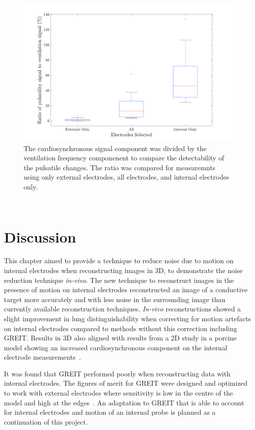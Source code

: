 \begin{figure}
    \centering
	\includegraphics[width=\textwidth]{chapter7-internal_elec_motion/imgs/amplitude_ratio.pdf} 
	\caption[Results of the probe location correction]{\label{fig:amplitude_ratio} 
	The cardiosynchronous signal component was divided by the ventilation frequency 
	componenent to compare the detectability of the pulsatile changes. The ratio was compared 
	for measuremnts using only external electrodes, all electrodes, and internal electrodes only.}
\end{figure}~

\section{Discussion}

This chapter aimed to provide a technique to reduce noise due to motion on internal
electrodes when reconstructing images in 3D, to demonstrate the noise reduction technique
\emph{in-vivo}. The new technique to reconstruct images in the presence of motion 
on internal electrodes reconstructed an image of a conductive target 
more accurately and with less noise in the surrounding image than currently
available reconstruction techniques. \emph{In-vivo}
reconstructions showed a slight improvement in lung distinguishability when correcting
for motion artefacts on internal electrodes compared to methods without this correction 
including GREIT. Results in 3D also aligned with results from a 2D study in a porcine 
model showing an increased cardiosynchronous component on the internal electrode 
measurements~\parencite{czaplik_application_2014}.

It was found that GREIT performed poorly when reconstructing data with internal electrodes.
The figures of merit for GREIT were designed and optimized to work with external electrodes 
where sensitivity is low in the centre of the model and high at the 
edges~\parencite{adler_greit_2009}. An adaptation to GREIT that is able to 
account for internal electrodes and motion of an internal probe is planned as a
continuation of this project.  

